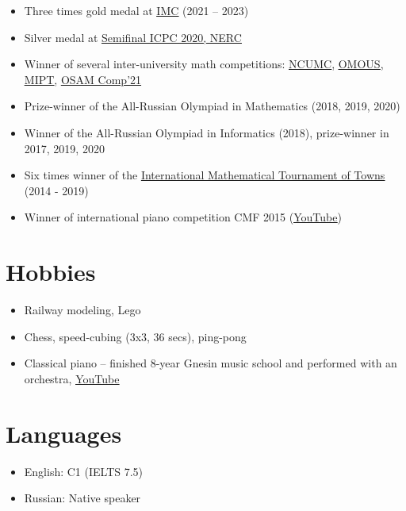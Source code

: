 \documentclass[letterpaper,11pt]{article}
\newcommand{\resumeItemListStart}{\begin{itemize}}
\newcommand{\resumeItemListEnd}{\end{itemize}\vspace{-8pt}}
\newcommand{\resumeItem}[1]{\item\small{{#1 \vspace{-2pt}}}}
\newcommand{\resumeSubItem}[1]{\resumeItem{#1}\vspace{-4pt}}
\begin{document}
\resumeItemListStart
\resumeSubItem{Three times gold medal at \href{https://imc-math.org.uk}{\underline{IMC}} (2021 -- 2023)}
\resumeSubItem{Silver medal at \href{https://neerc.ifmo.ru/archive/2020.html}{\underline{Semifinal ICPC 2020, NERC}}}
\resumeSubItem{Winner of several inter-university math competitions: \href{https://iuhd.edu.tm/competition/44}{\underline{NCUMC}}, \href{https://iuhd.edu.tm/competition/45}{\underline{OMOUS}}, \href{http://www.rkarasev.ru/note/66}{\underline{MIPT}}, \href{https://cs.hse.ru/en/announcements/504365867.html}{\underline{OSAM Comp'21}}}
\resumeSubItem{Prize-winner of the All-Russian Olympiad in Mathematics (2018, 2019, 2020)}
\resumeSubItem{Winner of the All-Russian Olympiad in Informatics (2018), prize-winner in 2017, 2019, 2020}
\resumeSubItem{Six times winner of the \href{https://www.turgor.ru/en/}{\underline{International Mathematical Tournament of Towns}} (2014 - 2019)}
\resumeSubItem{Winner of international piano competition CMF 2015 (\href{https://www.youtube.com/watch?v=mFGwCgjjaP8}{\underline{YouTube}})}
\resumeItemListEnd


\section{Hobbies}

\resumeItemListStart
\resumeSubItem{Railway modeling, Lego}
\resumeSubItem{Chess, speed-cubing (3x3, 36 secs), ping-pong}
\resumeSubItem{Classical piano -- finished 8-year Gnesin music school and performed with an orchestra, \href{https://www.youtube.com/watch?v=KPUQTMAy0bQ&list=PL3n6QsMnv3lZyL8XD4WcQh4mhJ-REqBKN}{\underline{YouTube}}}
\resumeItemListEnd


\section{Languages}

\resumeItemListStart
\resumeSubItem{English: C1 (IELTS 7.5)}
\resumeSubItem{Russian: Native speaker}
\resumeItemListEnd
\end{document}
